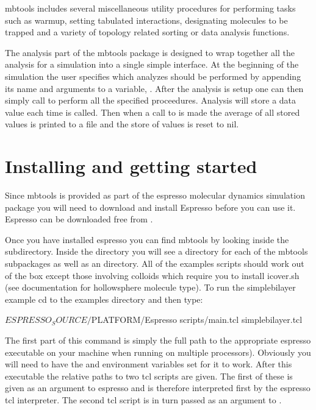 mbtools includes several miscellaneous utility procedures for
performing tasks such as warmup, setting tabulated interactions,
designating molecules to be trapped and a variety of topology related
sorting or data analysis functions.

The analysis part of the mbtools package is designed to wrap together
all the analysis for a simulation into a single simple interface. At
the beginning of the simulation the user specifies which analyzes
should be performed by appending its name and arguments to a variable,
. After the analysis is setup one can then
simply call  to perform all the specified
proceedures. Analysis will store a data value each time
 is called. Then when a call to
 is made the average of all stored values is
printed to a file and the store of values is reset to nil.

\section{Installing and getting started}

Since mbtools is provided as part of the espresso molecular dynamics
simulation package you will need to download and install Espresso
before you can use it. Espresso can be downloaded free from
.

Once you have installed espresso you can find mbtools by looking
inside the  subdirectory. Inside the
 directory you will see a directory for each
of the mbtools subpackages as well as an 
directory. All of the examples scripts should work out of the box
except those involving colloids which require you to install icover.sh
(see documentation for hollowsphere molecule type). To run the
simplebilayer example cd to the examples directory and then type:

\begin{code}
  $ESPRESSO_SOURCE/$PLATFORM/Espresso scripts/main.tcl simplebilayer.tcl
\end{code}

The first part of this command is simply the full path to the
appropriate espresso executable on your machine 
when running on multiple processors). Obviously
you will need to have the  and
 environment variables set for it to work. After
this executable the relative paths to two tcl scripts are given. The
first of these  is given as an argument to espresso
and is therefore interpreted first by the espresso tcl
interpreter. The second tcl script  is in
turn passed as an argument to .

